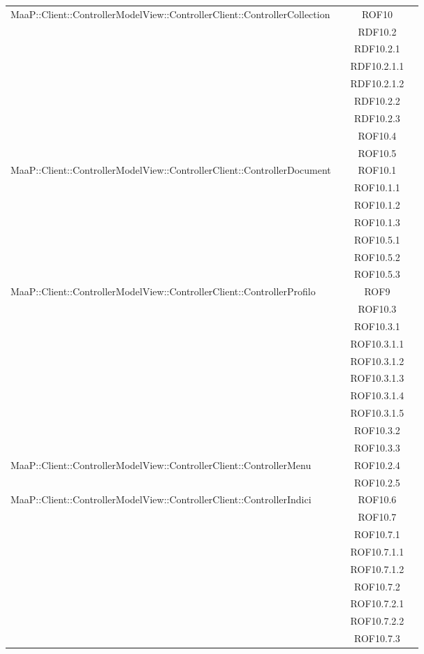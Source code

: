 \begin{center}
\begin{longtable}{|p{0.8\linewidth}|c|}
\midrule
MaaP::Client::ControllerModelView::ControllerClient::ControllerCollection
& ROF10\\
& RDF10.2\\
& RDF10.2.1\\
& RDF10.2.1.1\\
& RDF10.2.1.2\\
& RDF10.2.2\\
& RDF10.2.3\\
& ROF10.4\\
& ROF10.5\\


\midrule
MaaP::Client::ControllerModelView::ControllerClient::ControllerDocument
& ROF10.1\\
& ROF10.1.1\\
& ROF10.1.2\\
& ROF10.1.3\\
& ROF10.5.1\\
& ROF10.5.2\\
& ROF10.5.3\\


\midrule
MaaP::Client::ControllerModelView::ControllerClient::ControllerProfilo
& ROF9\\
& ROF10.3\\
& ROF10.3.1\\
& ROF10.3.1.1\\
& ROF10.3.1.2\\
& ROF10.3.1.3\\
& ROF10.3.1.4\\
& ROF10.3.1.5\\
& ROF10.3.2\\
& ROF10.3.3\\


\midrule
MaaP::Client::ControllerModelView::ControllerClient::ControllerMenu
& ROF10.2.4\\
& ROF10.2.5\\

\midrule
MaaP::Client::ControllerModelView::ControllerClient::ControllerIndici
& ROF10.6\\
& ROF10.7\\
& ROF10.7.1\\
& ROF10.7.1.1\\
& ROF10.7.1.2\\
& ROF10.7.2\\
& ROF10.7.2.1\\
& ROF10.7.2.2\\
& ROF10.7.3\\



\end{longtable}
\end{center}
